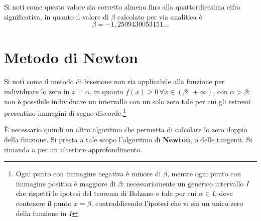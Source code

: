 Si noti come questo valore sia corretto almeno fino alla quattordicesima cifra significativa, in quanto il valore di $\beta$ calcolato per via analitica è
\[
\beta=-1,2509430053151\dots
\]

\begin{table}
\end{table}

\section{Metodo di Newton}

Si noti come il metodo di bisezione non sia applicabile alla funzione per individuare lo zero in $x=\alpha$, in quanto $f(x)\ge 0\,\forall x\in (\beta;\,+\infty)$, con $\alpha>\beta$: non è possibile individuare un intervallo con un solo zero tale per cui gli estremi presentino immagini di segno discorde.\footnote{Ogni punto con immagine negativa è minore di $\beta$, mentre ogni punto con immagine positiva è maggiore di $\beta$: necessariamente un generico intervallo $I$ che rispetti le ipotesi del teorema di Bolzano e tale per cui $\alpha\in I$, deve contenere il punto $x=\beta$, contraddicendo l'ipotesi che vi sia un unico zero della funzione in $I$}

È necessario quindi un altro algoritmo che permetta di calcolare lo zero doppio della funzione. Si presta a tale scopo l'algoritmo di \textbf{Newton}, o delle tangenti. Si rimanda a \parencite[67-71]{num:an} per un ulteriore approfondimento.

